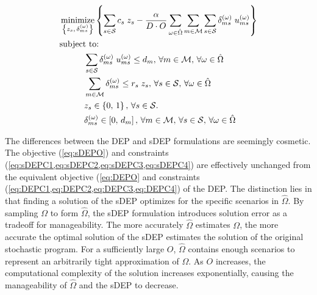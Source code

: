 \documentclass[12pt,dvipsnames]{report}
\DeclareMathOperator*{\argmin}{minimize}
\begin{document}
\begin{tcolorbox}[floatplacement = !ht, float, title = Sampled Deterministic Equivalent Program (sDEP) of \Cref{eq:SOPS1O,eq:SOPS1C1,eq:SOPS2O,eq:SOPS2C1,eq:SOPS2C2,eq:SOPS2C3,eq:SOPS2C4}]
\begin{align}
& \argmin_{\left\{ z_s,\, \delta_{ms}^{\left( \omega \right)} \right\}} \left\{ \sum_{s \in \mathcal{S}} c_s \; z_s - \frac{\alpha}{D \cdot O} \sum_{\omega \in \hat{\Omega}} \sum_{m \in \mathcal{M}} \sum_{s \in \mathcal{S}} \delta_{ms}^{\left( \omega \right)} \; u_{ms}^{\left( \omega \right)} \right\} \label{eq:sDEPO}\\
& \text{subject to:}  \nonumber \\
& \hspace{0.4in} \sum_{s \in \mathcal{S}} \delta_{ms}^{\left( \omega \right)} \; u_{ms}^{\left( \omega \right)} \leq d_m,\, \forall m \in \mathcal{M},\, \forall \omega \in \hat{\Omega} \label{eq:sDEPC1}\\
& \hspace{0.4in} \sum_{m \in \mathcal{M}} \delta_{ms}^{\left( \omega \right)} \leq r_s \; z_s,\, \forall s \in \mathcal{S},\, \forall \omega \in \hat{\Omega} \label{eq:sDEPC2}\\
& \hspace{0.4in} z_s \in \left\{ 0,\, 1 \right\},\, \forall s \in \mathcal{S}. \label{eq:sDEPC3}\\
& \hspace{0.4in} \delta_{ms}^{\left( \omega \right)} \in \left[ 0,\, d_m \right],\, \forall m \in \mathcal{M},\, \forall s \in \mathcal{S},\, \forall \omega \in \hat{\Omega} \label{eq:sDEPC4}
\end{align}
\end{tcolorbox}

The differences between the DEP and sDEP formulations are seemingly cosmetic.  The objective (\cref{eq:sDEPO}) and constraints (\cref{eq:sDEPC1,eq:sDEPC2,eq:sDEPC3,eq:sDEPC4}) are effectively unchanged from the equivalent objective (\cref{eq:DEPO} and constraints (\cref{eq:DEPC1,eq:DEPC2,eq:DEPC3,eq:DEPC4}) of the DEP.  The distinction lies in that finding a solution of the sDEP optimizes for the specific scenarios in $\hat{\Omega}$.  By sampling $\Omega$ to form $\hat{\Omega}$, the sDEP formulation introduces solution error as a tradeoff for manageability.  The more accurately $\hat{\Omega}$ estimates $\Omega$, the more accurate the optimal solution of the sDEP estimates the solution of the original stochastic program.  For a sufficiently large $O$, $\hat{\Omega}$ contains enough scenarios to represent an arbitrarily tight approximation of $\Omega$.  As $O$ increases, the computational complexity of the solution increases exponentially, causing the manageability of $\hat{\Omega}$ and the sDEP to decrease.
\end{document}
